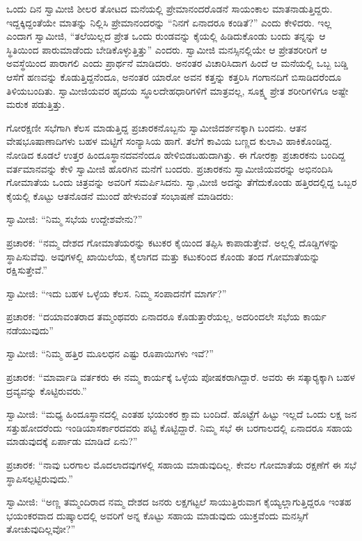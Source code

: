  ಒಂದು ದಿನ ಸ್ವಾಮೀಜಿ ಶೀಲರ ತೋಟದ ಮನೆಯಲ್ಲಿ ಪ್ರೇಮಾನಂದರೊಡನೆ ಸಾಯಂಕಾಲ ಮಾತನಾಡುತ್ತಿದ್ದರು. ಇದ್ದಕ್ಕಿದ್ದಂತೆಯೇ ಮಾತನ್ನು ನಿಲ್ಲಿಸಿ ಪ್ರೇಮಾನಂದರನ್ನು “ನಿನಗೆ ಏನಾದರೂ ಕಂಡಿತೆ?” ಎಂದು ಕೇಳಿದರು. ಇಲ್ಲ ಎಂದಾಗ ಸ್ವಾಮೀಜಿ, “ತಲೆಯಿಲ್ಲದ ಪ್ರೇತ ಒಂದು ರುಂಡವನ್ನು ಕೈಯಲ್ಲಿ ಹಿಡಿದುಕೊಂಡು ಬಂದು ತನ್ನನ್ನು ಆ ಸ್ಥಿತಿಯಿಂದ ಪಾರುಮಾಡೆಂದು ಬೇಡಿಕೊಳ್ಳುತ್ತಿತ್ತು” ಎಂದರು. ಸ್ವಾಮೀಜಿ ಮನಸ್ಸಿನಲ್ಲಿಯೇ ಆ ಪ್ರೇತಶರೀರಿಗೆ ಆ ಅವಸ್ಥೆಯಿಂದ ಪಾರಾಗಲಿ ಎಂದು ಪ್ರಾರ್ಥನೆ ಮಾಡಿದರು. ಅನಂತರ ವಿಚಾರಿಸಿದಾಗ ಹಿಂದೆ ಆ ಮನೆಯಲ್ಲಿ ಒಬ್ಬ ಬಡ್ಡಿ ಆಸೆಗೆ ಹಣವನ್ನು ಕೊಡುತ್ತಿದ್ದನೆಂದೂ, ಅನಂತರ ಯಾರೋ ಅವನ ಕತ್ತನ್ನು ಕತ್ತರಿಸಿ ಗಂಗಾನದಿಗೆ ಬಿಸಾಡಿದರೆಂದೂ ತಿಳಿಯಬಂದಿತು. ಸ್ವಾಮೀಜಿಯವರ ಹೃದಯ ಸ್ಥೂಲದೇಹಧಾರಿಗಳಿಗೆ ಮಾತ್ರವಲ್ಲ, ಸೂಕ್ಷ್ಮ ಪ್ರೇತ ಶರೀರಿಗಳಿಗೂ ಅಷ್ಟೇ ಮರುಕ ಪಡುತ್ತಿತ್ತು. 

 ಗೋರಕ್ಷಣೀ ಸಭೆಗಾಗಿ ಕೆಲಸ ಮಾಡುತ್ತಿದ್ದ ಪ್ರಚಾರಕನೊಬ್ಬನು ಸ್ವಾಮೀಜಿ\break ದರ್ಶನಕ್ಕಾಗಿ ಬಂದನು. ಆತನ ವೇಷಭೂಷಾಣಾದಿಗಳು ಬಹಳ ಮಟ್ಟಿಗೆ ಸಂನ್ಯಾಸಿಯ ಹಾಗೆ. ತಲೆಗೆ ಕಾವಿಯ ಬಣ್ಣದ ಕುಲಾವಿ ಹಾಕಿಕೊಂಡಿದ್ದ. ನೋಡಿದ ಕೂಡಲೆ ಉತ್ತರ ಹಿಂದೂಸ್ಥಾನದವನೆಂದೂ ಹೇಳಿಬಿಡಬಹುದಾಗಿತ್ತು. ಈ ಗೋರಕ್ಷಾ ಪ್ರಚಾರಕನು ಬಂದಿದ್ದ ವರ್ತಮಾನವನ್ನು ಕೇಳಿ ಸ್ವಾಮೀಜಿ ಹೊರಗಿನ ಮನೆಗೆ ಬಂದರು. ಪ್ರಚಾರಕನು ಸ್ವಾಮೀಜಿಯವರನ್ನು ಅಭಿನಂದಿಸಿ ಗೋಮಾತೆಯ ಒಂದು ಚಿತ್ರವನ್ನು ಅವರಿಗೆ ಸಮರ್ಪಿಸಿದನು. ಸ್ವಾ,ಮೀಜಿ ಅದನ್ನು ತೆಗೆದುಕೊಂಡು ಹತ್ತಿರದಲ್ಲಿದ್ದ ಒಬ್ಬರ ಕೈಯಲ್ಲಿ ಕೊಟ್ಟು ಆತನೊಡನೆ ಮುಂದೆ ಹೇಳುವಂತೆ ಸಂಭಾಷಣೆ ಮಾಡಿದರು: 

 ಸ್ವಾಮೀಜಿ: “ನಿಮ್ಮ ಸಭೆಯ ಉದ್ದೇಶವೇನು?” 

 ಪ್ರಚಾರಕ: “ನಮ್ಮ ದೇಶದ ಗೋಮಾತೆಯರನ್ನು ಕಟುಕರ ಕೈಯಿಂದ ತಪ್ಪಿಸಿ ಕಾಪಾಡುತ್ತೇವೆ. ಅಲ್ಲಲ್ಲಿ ದೊಡ್ಡಿಗಳನ್ನು ಸ್ಥಾಪಿಸುವೆವು. ಅವುಗಳಲ್ಲಿ ಖಾಯಿಲೆಯ, ಕೈಲಾಗದ ಮತ್ತು ಕಟುಕರಿಂದ ಕೊಂಡು ತಂದ ಗೋಮಾತೆಯನ್ನು ರಕ್ಷಿಸುತ್ತೇವೆ.” 

 ಸ್ವಾಮೀಜಿ: “ಇದು ಬಹಳ ಒಳ್ಳೆಯ ಕೆಲಸ. ನಿಮ್ಮ ಸಂಪಾದನೆಗೆ ಮಾರ್ಗ?” 

 ಪ್ರಚಾರಕ: “ದಯಾವಂತರಾದ ತಮ್ಮಂಥವರು ಏನಾದರೂ ಕೊಡುತ್ತಾರೆಯಲ್ಲ, ಅದರಿಂದಲೇ ಸಭೆಯ ಕಾರ್ಯ ನಡೆಯುವುದು” 

 ಸ್ವಾಮೀಜಿ: “ನಿಮ್ಮ ಹತ್ತಿರ ಮೂಲಧನ ಎಷ್ಟು ರೂಪಾಯಿಗಳು ಇವೆ?” 

 ಪ್ರಚಾರಕ: “ಮಾರ್ವಾಡಿ ವರ್ತಕರು ಈ ನಮ್ಮ ಕಾರ್ಯಕ್ಕೆ ಒಳ್ಳೆಯ ಪೋಷಕರಾಗಿದ್ದಾರೆ. ಅವರು ಈ ಸತ್ಕಾರ‍್ಯಕ್ಕಾಗಿ ಬಹಳ ದ್ರವ್ಯವನ್ನು ಕೊಟ್ಟಿರುವರು.” 

 ಸ್ವಾಮೀಜಿ: “ಮಧ್ಯ ಹಿಂದೂಸ್ಥಾನದಲ್ಲಿ ಎಂತಹ ಭಯಂಕರ ಕ್ಷಾಮ ಬಂದಿದೆ. ಹೊಟ್ಟೆಗೆ ಹಿಟ್ಟು ಇಲ್ಲದೆ ಒಂದು ಲಕ್ಷ ಜನ ಸತ್ತುಹೋದರೆಂದು ಇಂಡಿಯಾ\break ಸರ್ಕಾರದವರು ಪಟ್ಟಿ ಕೊಟ್ಟಿದ್ದಾರೆ. ನಿಮ್ಮ ಸಭೆ ಈ ಬರಗಾಲದಲ್ಲಿ ಏನಾದರೂ ಸಹಾಯ ಮಾಡುವುದಕ್ಕೆ ಏರ್ಪಾಡು ಮಾಡಿದೆ ಏನು?” 

 ಪ್ರಚಾರಕ: “ನಾವು ಬರಗಾಲ ಮೊದಲಾದವುಗಳಲ್ಲಿ ಸಹಾಯ ಮಾಡುವುದಿಲ್ಲ. ಕೇವಲ ಗೋಮಾತೆಯ ರಕ್ಷಣೆಗೆ ಈ ಸಭೆ ಸ್ಥಾಪಿಸಲ್ಪಟ್ಟಿರುವುದು.” 

 ಸ್ವಾಮೀಜಿ: “ಅಣ್ಣ ತಮ್ಮಂದಿರಾದ ನಮ್ಮ ದೇಶದ ಜನರು ಲಕ್ಷಗಟ್ಟಲೆ ಸಾಯುತ್ತಿರುವಾಗ ಕೈಯ್ಯಲ್ಲಾಗುತ್ತಿದ್ದರೂ ಇಂತಹ ಭಯಂಕರವಾದ ದುಷ್ಕಾಲದಲ್ಲಿ ಅವರಿಗೆ ಅನ್ನ ಕೊಟ್ಟು ಸಹಾಯ ಮಾಡುವುದು ಯುಕ್ತವೆಂದು ಮನಸ್ಸಿಗೆ ತೋಚುವುದಿಲ್ಲವೋ?” 

